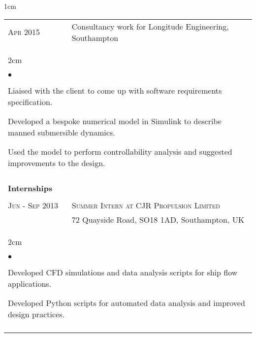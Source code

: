\documentclass[a4paper,10pt]{article}
\newcommand{\squishlist}{
	\begin{list}{$\bullet$}
	{
		\setlength{\itemsep}{0pt}
		\setlength{\parsep}{0pt}
		\setlength{\topsep}{0pt}
		\setlength{\partopsep}{0pt}
		\setlength{\leftmargin}{2em}
		\setlength{\labelwidth}{1.5em}
		\setlength{\labelsep}{0.5em}
	}
}
\newcommand{\squishend}{\end{list}}
\begin{document}
\begin{minipage}{\textwidth}
\begin{adjustwidth}{}{1cm}
\begin{tabular}{p{3.5cm} p{12.9cm}}
\textsc{Apr 2015} & Consultancy work for Longitude Engineering, Southampton \vspace{0.1cm} \\
%
\multicolumn{2}{l}{
\hspace{1cm}\begin{minipage}[t]{\textwidth}
\begin{adjustwidth}{}{2cm}
\squishlist
	\item Liaised with the client to come up with software requirements specification.
	\item Developed a bespoke numerical model in Simulink to describe manned submersible dynamics.
	\item Used the model to perform controllability analysis and suggested improvements to the design.
\squishend
\end{adjustwidth}
\end{minipage}
} \\


\\
\textbf{Internships} \\
\\

\textsc{Jun - Sep 2013} & \textsc{Summer Intern at CJR Propulsion Limited} \\
						& 72 Quayside Road, SO18 1AD, Southampton, UK \vspace{0.1cm} \\
%
\multicolumn{2}{l}{
\hspace{1cm}\begin{minipage}[t]{\textwidth}
\begin{adjustwidth}{}{2cm}
\squishlist
	\item Developed CFD simulations and data analysis scripts for ship flow applications.
	\item Developed Python scripts for automated data analysis and improved design practices.
\squishend
\end{adjustwidth}
\end{minipage}
} \\
\\


\end{tabular}
\end{adjustwidth}
\end{minipage}
\end{document}
